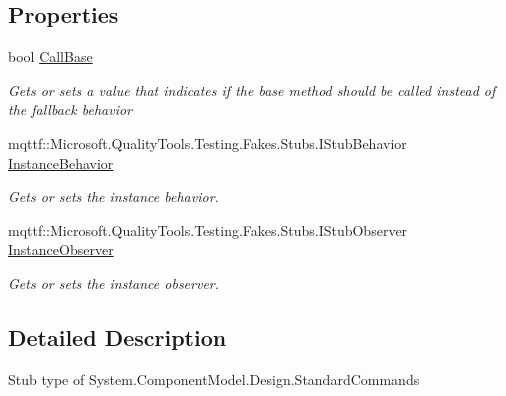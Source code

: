 \subsection*{Properties}
\begin{DoxyCompactItemize}
\item 
bool \hyperlink{class_system_1_1_component_model_1_1_design_1_1_fakes_1_1_stub_standard_commands_a8791b9031b0ed4af215ca700997d06aa}{Call\-Base}
\begin{DoxyCompactList}\small\item\em Gets or sets a value that indicates if the base method should be called instead of the fallback behavior\end{DoxyCompactList}\item 
mqttf\-::\-Microsoft.\-Quality\-Tools.\-Testing.\-Fakes.\-Stubs.\-I\-Stub\-Behavior \hyperlink{class_system_1_1_component_model_1_1_design_1_1_fakes_1_1_stub_standard_commands_a468748554896f31955ba87cd439edca0}{Instance\-Behavior}
\begin{DoxyCompactList}\small\item\em Gets or sets the instance behavior.\end{DoxyCompactList}\item 
mqttf\-::\-Microsoft.\-Quality\-Tools.\-Testing.\-Fakes.\-Stubs.\-I\-Stub\-Observer \hyperlink{class_system_1_1_component_model_1_1_design_1_1_fakes_1_1_stub_standard_commands_aaf76fa3f57af8e7f663581bc34ac96e6}{Instance\-Observer}
\begin{DoxyCompactList}\small\item\em Gets or sets the instance observer.\end{DoxyCompactList}\end{DoxyCompactItemize}


\subsection{Detailed Description}
Stub type of System.\-Component\-Model.\-Design.\-Standard\-Commands



